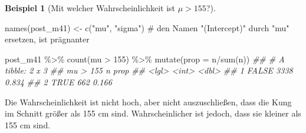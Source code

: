 \documentclass[
  a4paper,
  DIV=11]{scrreprt}
\newenvironment{Shaded}{\begin{snugshade}}{\end{snugshade}}
\newcommand{\AttributeTok}[1]{\textcolor[rgb]{0.40,0.45,0.13}{#1}}
\newcommand{\CommentTok}[1]{\textcolor[rgb]{0.37,0.37,0.37}{#1}}
\newcommand{\DecValTok}[1]{\textcolor[rgb]{0.68,0.00,0.00}{#1}}
\newcommand{\DocumentationTok}[1]{\textcolor[rgb]{0.37,0.37,0.37}{\textit{#1}}}
\newcommand{\FunctionTok}[1]{\textcolor[rgb]{0.28,0.35,0.67}{#1}}
\newcommand{\NormalTok}[1]{\textcolor[rgb]{0.00,0.23,0.31}{#1}}
\newcommand{\OtherTok}[1]{\textcolor[rgb]{0.00,0.23,0.31}{#1}}
\newcommand{\SpecialCharTok}[1]{\textcolor[rgb]{0.37,0.37,0.37}{#1}}
\newcommand{\StringTok}[1]{\textcolor[rgb]{0.13,0.47,0.30}{#1}}
\theoremstyle{definition}
\newtheorem{example}{Beispiel}[chapter]
\theoremstyle{remark}
\begin{document}
\leavevmode{}%
\begin{example}[Mit welcher Wahrscheinlichkeit ist
\(\mu>155\)?]\label{exm-kung1}

\begin{Shaded}
\begin{Highlighting}[]
\FunctionTok{names}\NormalTok{(post\_m41) }\OtherTok{\textless{}{-}} 
  \FunctionTok{c}\NormalTok{(}\StringTok{"mu"}\NormalTok{, }\StringTok{"sigma"}\NormalTok{)  }\CommentTok{\# den Namen "(Intercept)" durch "mu" ersetzen, ist prägnanter}

\NormalTok{post\_m41 }\SpecialCharTok{\%\textgreater{}\%} 
  \FunctionTok{count}\NormalTok{(mu }\SpecialCharTok{\textgreater{}} \DecValTok{155}\NormalTok{) }\SpecialCharTok{\%\textgreater{}\%} 
  \FunctionTok{mutate}\NormalTok{(}\AttributeTok{prop =}\NormalTok{ n}\SpecialCharTok{/}\FunctionTok{sum}\NormalTok{(n))}
\DocumentationTok{\#\# \# A tibble: 2 x 3}
\DocumentationTok{\#\#   \textasciigrave{}mu \textgreater{} 155\textasciigrave{}     n  prop}
\DocumentationTok{\#\#   \textless{}lgl\textgreater{}      \textless{}int\textgreater{} \textless{}dbl\textgreater{}}
\DocumentationTok{\#\# 1 FALSE       3338 0.834}
\DocumentationTok{\#\# 2 TRUE         662 0.166}
\end{Highlighting}
\end{Shaded}

Die Wahrscheinlichkeit ist nicht hoch, aber nicht auszuschließen, dass
die Kung im Schnitt größer als 155 cm sind. Wahrscheinlicher ist jedoch,
dass sie kleiner als 155 cm sind.

\end{example}
\end{document}
